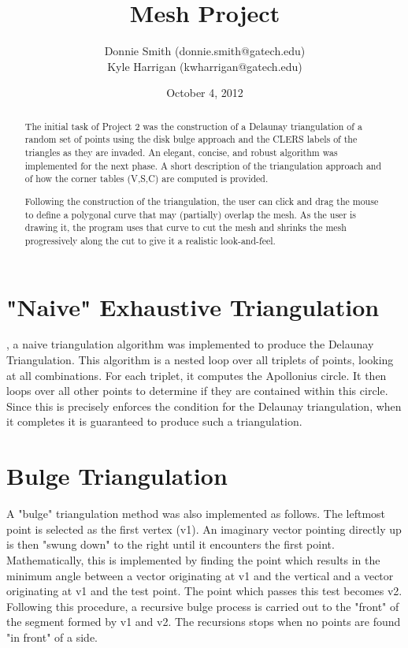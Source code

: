 \documentclass[letterpaper,10pt]{IEEEtran}
\title{Mesh Project}
\author{
Donnie Smith (donnie.smith@gatech.edu) \\
Kyle Harrigan (kwharrigan@gatech.edu) 
}
\date{October 4, 2012}                                           %
\begin{document}


\maketitle

 \begin{abstract}
 
The initial task of Project 2 was the construction of a Delaunay triangulation \cite{wiki:delaunay} of a random set of points using the disk bulge approach and the CLERS \cite{Rossignac99wrapzip} labels of the triangles as they are invaded.  An elegant, concise, and robust algorithm was implemented for the next phase. A short description of the triangulation approach and of how the corner tables (V,S,C) \cite{Rossignac04compressingvolumes} are computed is provided.

Following the construction of the triangulation, the user can click and drag the mouse to define a polygonal curve that may (partially) overlap the mesh.  As the user is drawing it, the program uses that curve to cut the mesh and shrinks the mesh progressively along the cut to give it a realistic look-and-feel.
 
 \end{abstract}
 
\section{"Naive" Exhaustive Triangulation}
 , a naive triangulation algorithm was implemented to produce the Delaunay Triangulation.  This algorithm is a nested loop over all triplets of points, looking at all combinations.  For each triplet, it computes the Apollonius circle.  It then loops over all other points to determine if they are contained within this circle.  Since this is precisely enforces the condition for the Delaunay triangulation, when it completes it is guaranteed to produce such a triangulation.  

\section{Bulge Triangulation}
A "bulge" triangulation method was also implemented as follows.  The leftmost point is selected as the first vertex (v1).  An imaginary vector pointing directly up is then "swung down" to the right until it encounters the first point.  Mathematically, this is implemented by finding the point which results in the minimum angle between a vector originating at v1 and the vertical and a vector originating at v1 and the test point.  The point which passes this test becomes v2.  
Following this procedure, a recursive bulge process is carried out to the "front" of the segment formed by v1 and v2.    The recursions stops when no points are found "in front" of a side.   
\end{document}
